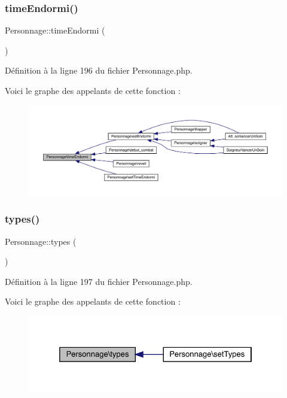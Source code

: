 \subsubsection{\texorpdfstring{time\+Endormi()}{timeEndormi()}}
{\footnotesize\ttfamily Personnage\+::time\+Endormi (\begin{DoxyParamCaption}{ }\end{DoxyParamCaption})}



Définition à la ligne 196 du fichier Personnage.\+php.

Voici le graphe des appelants de cette fonction \+:\nopagebreak
\begin{figure}[H]
\begin{center}
\leavevmode
\includegraphics[width=350pt]{class_personnage_a5fbe8f1f41e05e856ec6390bfb3e4f03_icgraph}
\end{center}
\end{figure}
\mbox{\label{class_personnage_a89e73f503d1184e71d703aba64eadea0}} 
\subsubsection{\texorpdfstring{types()}{types()}}
{\footnotesize\ttfamily Personnage\+::types (\begin{DoxyParamCaption}{ }\end{DoxyParamCaption})}



Définition à la ligne 197 du fichier Personnage.\+php.

Voici le graphe des appelants de cette fonction \+:\nopagebreak
\begin{figure}[H]
\begin{center}
\leavevmode
\includegraphics[width=325pt]{class_personnage_a89e73f503d1184e71d703aba64eadea0_icgraph}
\end{center}
\end{figure}
\mbox{\label{class_personnage_a2b3231199bcc4e3515dfada8efb24313}} 
